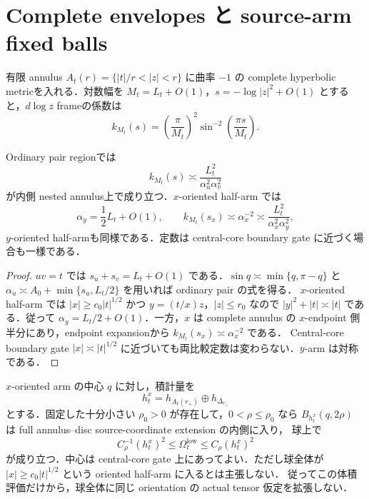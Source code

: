 \documentclass[a4paper,11pt]{ltjsarticle}
\numberwithin{equation}{section}
\theoremstyle{plain}
\theoremstyle{definition}
\theoremstyle{remark}
\begin{document}
\section{Complete envelopes と source-arm fixed balls}\label{coarse:sec:envelopes}

有限 annulus $A_t(r)=\{|t|/r<|z|<r\}$ に曲率 $-1$ の complete hyperbolic metricを入れる．対数幅を $M_t=L_t+O(1)$，$s=-\log|z|^2+O(1)$ とすると，$d\log z$ frameの係数は
\begin{equation}\label{coarse:eq:annulus-coeff}
 k_{M_t}(s)=\left(\frac{\pi}{M_t}\right)^2
 \sin^{-2}\left(\frac{\pi s}{M_t}\right).
\end{equation}

\begin{lemma}\label{coarse:lem:pair-arm-density}
Ordinary pair regionでは
\[
 k_{M_t}(s)\asymp\frac{L_t^2}{\alpha_u^2\alpha_v^2}
\]
が内側 nested annulus上で成り立つ．$x$-oriented half-arm では
\[
 \alpha_y=\frac12L_t+O(1),\qquad
 k_{M_t}(s_x)\asymp\alpha_x^{-2}
 \asymp\frac{L_t^2}{\alpha_x^2\alpha_y^2},
\]
$y$-oriented half-armも同様である．定数は central-core boundary gate に近づく場合も一様である．
\end{lemma}

\begin{proof}
$uv=t$ では $s_u+s_v=L_t+O(1)$ である．$\sin q\asymp\min\{q,\pi-q\}$ と
$\alpha_u\asymp A_0+\min\{s_u,L_t/2\}$ を用いれば ordinary pair の式を得る．
$x$-oriented half-arm では $|x|\ge c_0|t|^{1/2}$ かつ $y=(t/x)z$，$|z|\le r_0$ なので
$|y|^2+|t|\asymp|t|$ である．従って $\alpha_y=L_t/2+O(1)$．一方，$x$ は complete annulus の
$x$-endpoint 側半分にあり，endpoint expansionから $k_{M_t}(s_x)\asymp\alpha_x^{-2}$ である．
Central-core boundary gate $|x|\asymp|t|^{1/2}$ に近づいても両比較定数は変わらない．$y$-arm は対称である．
\end{proof}

\begin{lemma}\label{coarse:lem:arm-fixed-ball}
$x$-oriented arm の中心 $q$ に対し，積計量を
\[
 h_t^x=h_{A_t(r_+)}\oplus h_{\Delta_{r_+}}
\]
とする．固定した十分小さい $\rho_0>0$ が存在して，$0<\rho\le\rho_0$ なら
$B_{h_t^x}(q,2\rho)$ は full annulus--disc source-coordinate extension の内側に入り，
球上で
\begin{equation}\label{coarse:eq:arm-fixed-ball-density}
 C_\rho^{-1}(h_t^x)^2\le\Omega_t^{\mathrm{low}}
 \le C_\rho(h_t^x)^2
\end{equation}
が成り立つ．中心は central-core gate 上にあってよい．ただし球全体が
$|x|\ge c_0|t|^{1/2}$ という oriented half-arm に入るとは主張しない．
従ってこの体積評価だけから，球全体に同じ orientation の actual tensor 仮定を拡張しない．
\end{lemma}
\end{document}
